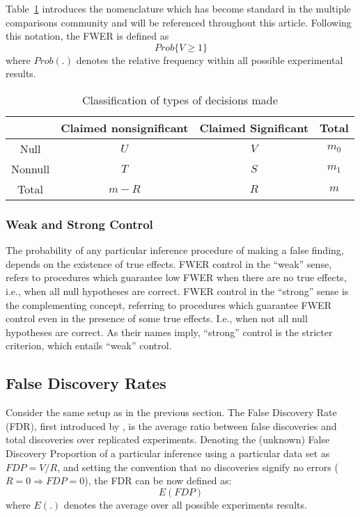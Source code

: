 \documentclass[review,12pt]{article}
\begin{document}
Table~\ref{tab:event_notation} introduces the nomenclature which has become standard in the multiple comparisons community and will be referenced throughout this article. Following this notation, the FWER is defined as $$Prob\{V \geq1  \}$$ where $Prob(.)$ denotes the relative frequency within all possible experimental results.



\begin{table}[h]
  \centering
\begin{tabular}{|c|c|c|c|}
\hline \rule[-1ex]{0pt}{1.5ex} & Claimed nonsignificant & Claimed Significant & Total \\ 
\hline
\hline \rule[-1ex]{0pt}{1.5ex} Null & $U$ & $V$ & $m_0$ \\ 
\hline \rule[-1ex]{0pt}{1.5ex} Nonnull & $T$ & $S$ & $m_1$ \\ 
\hline \rule[-1ex]{0pt}{1.5ex} Total & $m-R$ & $R$ & $m$ \\ 
\hline 
\end{tabular} 
  \caption{Classification of types of decisions made}
  \label{tab:event_notation}
\end{table}


\subsubsection{Weak and Strong Control}
The probability of any particular inference procedure of making a false finding, depends on the existence of true effects. FWER control in the ``weak'' sense, refers to procedures which guarantee low FWER when there are no true effects, i.e., when all null hypotheses are correct. 
FWER control in the ``strong'' sense is the complementing concept, referring to procedures which guarantee FWER control even in the presence of some true effects. I.e., when not all null hypotheses are correct. 
As their names imply, ``strong'' control is the stricter criterion, which entails ``weak'' control.




\subsection{\label{sub:fdr}False Discovery Rates}

Consider the same setup as in the previous section. The False Discovery Rate (FDR), first introduced by \citet{benjamini_controlling_1995}, is the average ratio between false discoveries and total discoveries over replicated experiments. 
Denoting the (unknown) False Discovery Proportion of a particular inference using a particular data set as $ FDP=V/R $, and setting the convention that no discoveries signify no errors ($R=0 \Rightarrow FDP=0$), the FDR can be now defined as:
$$E \left( FDP \right)$$ 
where $E(.)$ denotes the average over all possible experiments results.
\end{document}
